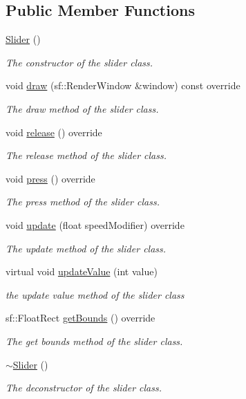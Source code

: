 \subsection*{Public Member Functions}
\begin{DoxyCompactItemize}
\item 
\hyperlink{class_slider_a535033fada8e25ef7291d2a52e6e437b}{Slider} ()
\begin{DoxyCompactList}\small\item\em The constructor of the slider class. \end{DoxyCompactList}\item 
void \hyperlink{class_slider_a5693b04af04da09cff43647283efaf6e}{draw} (sf\+::\+Render\+Window \&window) const override
\begin{DoxyCompactList}\small\item\em The draw method of the slider class. \end{DoxyCompactList}\item 
void \hyperlink{class_slider_ac1cb7218b21febfe4dffecc0055427ac}{release} () override
\begin{DoxyCompactList}\small\item\em The release method of the slider class. \end{DoxyCompactList}\item 
void \hyperlink{class_slider_a39223f6d54b6a517dea6cd842d34ecd7}{press} () override
\begin{DoxyCompactList}\small\item\em The press method of the slider class. \end{DoxyCompactList}\item 
void \hyperlink{class_slider_a762b3a7ca00a3a665a1aeceba2e54fac}{update} (float speed\+Modifier) override
\begin{DoxyCompactList}\small\item\em The update method of the slider class. \end{DoxyCompactList}\item 
virtual void \hyperlink{class_slider_a5275d7ee0fa30d49b01a5f3ec376bcbe}{update\+Value} (int value)
\begin{DoxyCompactList}\small\item\em the update value method of the slider class \end{DoxyCompactList}\item 
sf\+::\+Float\+Rect \hyperlink{class_slider_a3ca5a06f3165d1bce77408f367abba50}{get\+Bounds} () override
\begin{DoxyCompactList}\small\item\em The get bounds method of the slider class. \end{DoxyCompactList}\item 
\hyperlink{class_slider_aaca12abbe07a83f925d66339aa332028}{$\sim$\+Slider} ()
\begin{DoxyCompactList}\small\item\em The deconstructor of the slider class. \end{DoxyCompactList}\end{DoxyCompactItemize}
